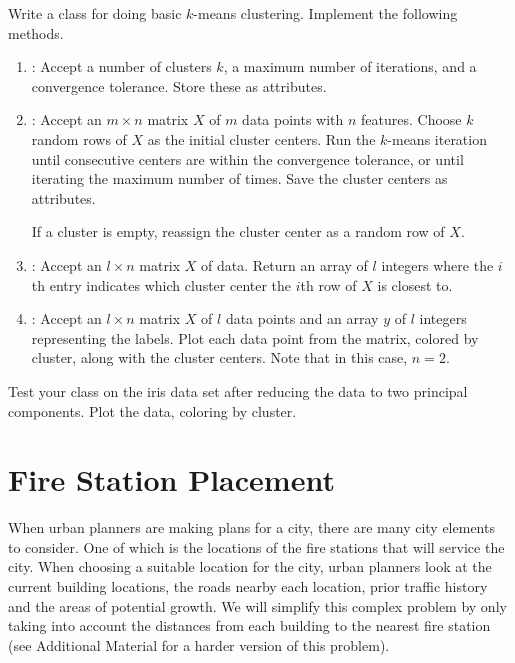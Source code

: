 \begin{problem}
Write a  class for doing basic $k$-means clustering.
Implement the following methods.
\begin{enumerate}
\item {}: Accept a number of clusters $k$, a maximum number of iterations, and a convergence tolerance.
Store these as attributes.

\item {}: Accept an $m \times n$ matrix $X$ of $m$ data points with $n$ features.
Choose $k$ random rows of $X$ as the initial cluster centers.
Run the $k$-means iteration until consecutive centers are within the convergence tolerance, or until iterating the maximum number of times.
Save the cluster centers as attributes.

If a cluster is empty, reassign the cluster center as a random row of $X$.

\item {}: Accept an $l \times n$ matrix $X$ of data.
Return an array of $l$ integers where the $i$th entry indicates which cluster center the $i$th row of $X$ is closest to.

\item {}: Accept an $l \times n$ matrix $X$ of $l$ data points and an array $y$ of $l$ integers representing the labels.
Plot each data point from the matrix, colored by cluster, along with the cluster centers.
Note that in this case, $n = 2$.
\end{enumerate}
%
Test your class on the iris data set after reducing the data to two principal components.
Plot the data, coloring by cluster.
\end{problem}

\section*{Fire Station Placement} %
When urban planners are making plans for a city, there are many city elements to consider. 
One of which is the locations of the fire stations that will service the city.
When choosing a suitable location for the city, urban planners look at the current building locations, the roads nearby each location, prior traffic history and the areas of potential growth.
We will simplify this complex problem by only taking into account the distances from each building to the nearest fire station (see Additional Material for a harder version of this problem).

